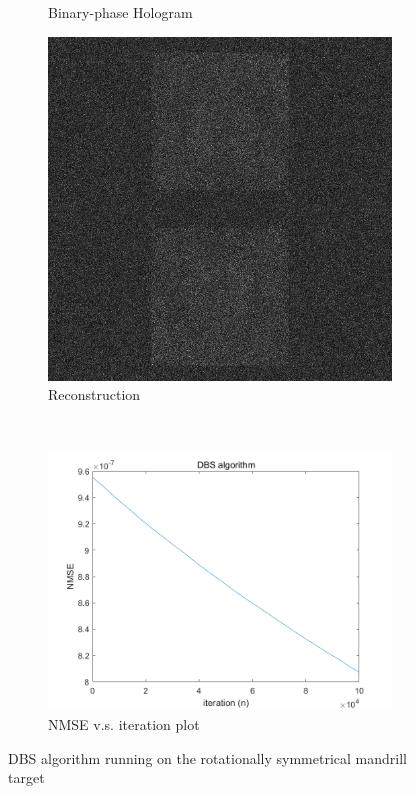 \begin{figure}[H]
\begin{subfigure}[t]{0.3\textwidth}
    \caption{Binary-phase Hologram}
    \label{fig:DBS_mandrill_2_Holo}
  \end{subfigure}
  \hfill
  \begin{subfigure}[t]{0.3\textwidth}
    \centering
    \includegraphics[width=\textwidth]{DBS_mandrill_2_recon_intensity.jpg}
    \caption{Reconstruction}
    \label{fig:DBS_mandrill_2_recon_intensity}
  \end{subfigure}
  \\
  \begin{subfigure}[t]{0.7\textwidth}
    \centering
    \includegraphics[width=\textwidth]{DBS_mandrill_2_convergence.png}
    \caption{NMSE v.s. iteration plot}
    \label{fig:DBS_mandrill_2_convergence}
  \end{subfigure}
  \caption{DBS algorithm running on the rotationally symmetrical mandrill target}
  \label{fig:DBS algorithm running on the rotationally symmetrical mandrill target}
\end{figure}


